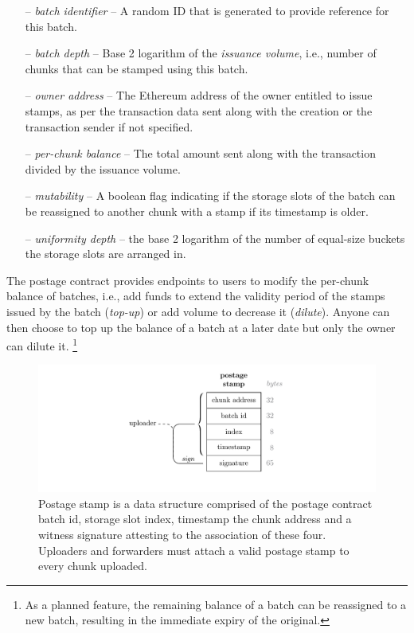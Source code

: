 \begin{itemize}[noitemsep]
\item[--] \emph{batch identifier} -- A random ID that is generated to provide reference for this batch.
\item[--] \emph{batch depth} -- Base 2 logarithm of the \emph{issuance volume}, i.e., number of chunks that can be stamped using this batch. 
\item[--] \emph{owner address} -- The Ethereum address of the owner entitled to issue stamps, as per the transaction data sent along with the creation or the  transaction sender if not specified.
\item[--] \emph{per-chunk balance} -- The total amount sent along with the transaction divided by the issuance volume.
\item[--] \emph{mutability} -- A boolean flag indicating if the storage slots of the batch can be reassigned to another chunk with a stamp if its timestamp is older. 
\item[--] \emph{uniformity depth} -- the base 2 logarithm of the number of equal-size buckets the storage slots are arranged in.
\end{itemize}

The postage contract provides endpoints to users to modify the per-chunk balance of batches, i.e., add funds to extend the validity period of the stamps issued by the batch (\/\emph{top-up}) or add volume to decrease it (\/\emph{dilute}).
Anyone can then choose to top up the balance of a batch at a later date but only the owner can dilute it.%
%
\footnote{As a planned feature, the remaining balance of a batch can be reassigned to a new batch, resulting in the immediate expiry of the original.}



\begin{figure}[!ht]
  \centering
    \includegraphics[width=\textwidth]{fig/postage-stamp-structure.pdf}
  \caption[Postage stamp]{Postage stamp is a data structure comprised of the postage contract batch id, storage slot index, timestamp the chunk address and a witness signature attesting to the association of these four. Uploaders and forwarders must attach a valid postage stamp to every chunk uploaded. }
  \label{fig:postage-stamp}
\end{figure}

